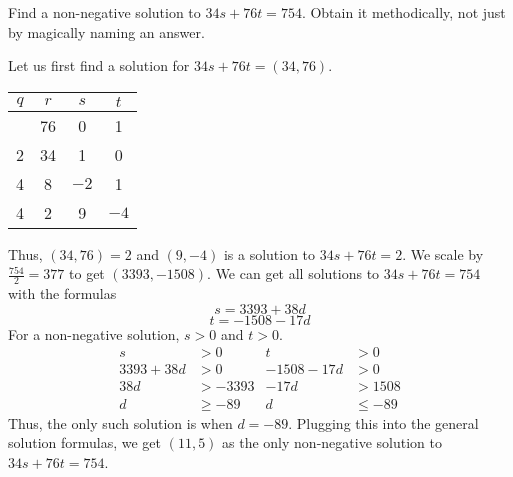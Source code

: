 \documentclass{article}
\begin{document}
\begin{problem}{}{}
    Find a non-negative solution to $34s + 76t = 754$. Obtain it methodically, not just by magically naming an answer.
\end{problem}
\begin{solution}{}{}
    Let us first find a solution for $34s+76t=(34,76)$.
    \begin{center}
        \begin{tabular}{c c c c}
            $q$ & $r$ & $s$ & $t$ \\
            \hline
            & 76 & 0 & 1 \\
            2 & 34 & 1 & 0 \\
            4 & 8 & $-2$ & 1 \\
            4 & 2 & 9 & $-4$
        \end{tabular}
    \end{center}
    Thus, $(34,76)=2$ and $(9,-4)$ is a solution to $34s+76t=2$. We scale by $\frac{754}{2}=377$ to get $(3393,-1508)$. We can get all solutions to $34s+76t=754$ with the formulas
    \[s=3393+38d\]
    \[t=-1508-17d\]
    For a non-negative solution, $s>0$ and $t>0$.
    \begin{align*}
        s&>0 & t&>0 \\
        3393+38d&>0 & -1508-17d&>0 \\
        38d&>-3393 & -17d&>1508 \\
        d &\geq -89 & d&\leq -89
    \end{align*}
    Thus, the only such solution is when $d=-89$. Plugging this into the general solution formulas, we get $(11,5)$ as the only non-negative solution to $34s+76t=754$.
\end{solution}
\end{document}
